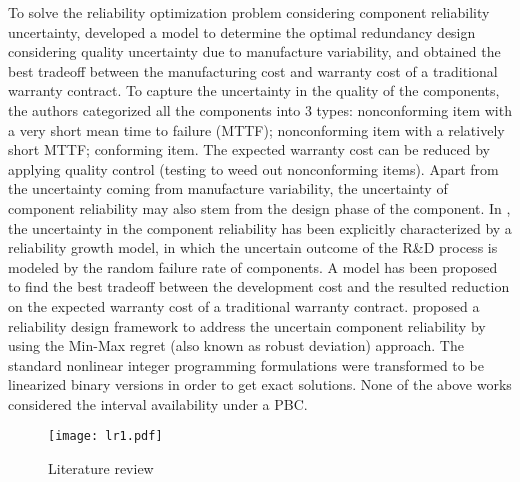 \documentclass[preprint,12pt]{elsarticle}
\begin{document}
To solve the reliability optimization problem considering component reliability uncertainty, \citet{Murthy1998} developed a model to determine the optimal redundancy design considering quality uncertainty due to manufacture variability, and obtained the best tradeoff between the manufacturing cost and warranty cost of a traditional warranty contract. To capture the uncertainty in the quality of the components, the authors categorized all the components into 3 types: nonconforming item with a very short mean time to failure (MTTF); nonconforming item with a relatively short MTTF; conforming item. The expected warranty cost can be reduced by applying quality control (testing to weed out nonconforming items). Apart from the uncertainty coming from manufacture variability, the uncertainty of component reliability may also stem from the design phase of the component. In \citet{Murthy2003}, the uncertainty in the component reliability has been explicitly characterized by a reliability growth model, in which the uncertain outcome of the R\&D process is modeled by the random failure rate of components. A model has been proposed to find the best tradeoff between the development cost and the resulted reduction on the expected warranty cost of a traditional warranty contract. \citet{Feizollahi} proposed a reliability design framework to address the uncertain component reliability by using the Min-Max regret (also known as robust deviation) approach. The standard nonlinear integer programming formulations were transformed to be linearized binary versions in order to get exact solutions. None of the above works considered the interval availability under a PBC.

\begin{figure}
\centering
\texttt{[image: lr1.pdf]}
 \caption{Literature review}
 \label{fig:literature}
\end{figure}
\end{document}

